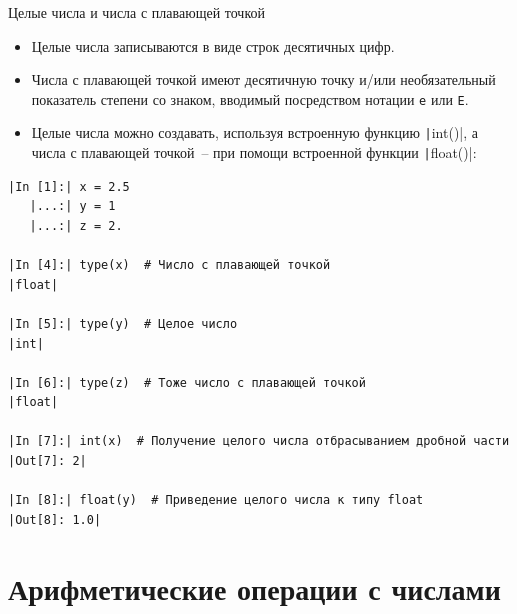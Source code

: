 \documentclass[aspectratio=169]{beamer}	%
\begin{document}
\begin{frame}[fragile]{Целые числа и числа с плавающей точкой}
\scriptsize
\begin{itemize}
	\item Целые числа записываются в виде строк десятичных цифр. 
	\item Числа с плавающей точкой имеют десятичную точку и/или необязательный показатель степени со знаком, вводимый посредством нотации \texttt{e} или \texttt{E}.
	\item Целые числа можно создавать, используя встроенную функцию \texttt|int()|, а числа с плавающей точкой~-- при помощи встроенной функции \texttt|float()|:
\end{itemize}
\begin{verbatim}
|In [1]:| x = 2.5
   |...:| y = 1
   |...:| z = 2.

|In [4]:| type(x)  # Число с плавающей точкой
|float|

|In [5]:| type(y)  # Целое число
|int|

|In [6]:| type(z)  # Тоже число с плавающей точкой
|float|

|In [7]:| int(x)  # Получение целого числа отбрасыванием дробной части
|Out[7]: 2|

|In [8]:| float(y)  # Приведение целого числа к типу float
|Out[8]: 1.0|
\end{verbatim}
\vfill
\end{frame}

\section{Арифметические операции с числами}
\sectionframe	%
\end{document}

